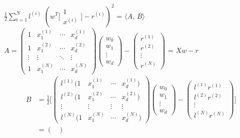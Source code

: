 \documentclass[12pt]{article}
\begin{document}
\begin {enumerate}
\begin {enumerate}
\begin {flushleft}
						$\frac{1}{2}\displaystyle\sum_{t=1}^N l^{(i)}$ 
							$(w^T \bigg[ \begin{array}{c}1 \\ x^{(i)}\end{array} \bigg] - r^{(i)})^2$ = 
							$\langle A$, $B \rangle$ \\
						$A = 
						\begin{pmatrix}
							1 & x_1^{(1)} & \cdots & x_d^{(1)} \\
							1 & x_1^{(2)} & \cdots & x_d^{(2)} \\
							\vdots & \vdots & \ddots & \vdots \\
							1 & x_1^{(N)} & \cdots & x_d^{(N)}
						\end{pmatrix}
						\begin{pmatrix}
							w_0 \\ w_1 \\ \vdots \\ w_d
						\end{pmatrix} - 
						\begin{pmatrix}
							r^{(1)} \\ r^{(2)} \\ \vdots \\ r^{(N)}
						\end{pmatrix}$ = $Xw-r$ \\
						\begin{align*}
							B & = \frac{1}{2} \Bigg[
							\begin{pmatrix}
								l^{(1)}(1 & x_1^{(1)} & \cdots & x_d^{(1)}) \\
								l^{(2)}(1 & x_1^{(2)} & \cdots & x_d^{(2)}) \\
								\vdots & \vdots & \vdots & \vdots \\
								l^{(N)}(1 & x_1^{(N)} & \cdots & x_d^{(N)})
							\end{pmatrix}
							\begin{pmatrix}
								w_0 \\ w_1 \\ \vdots \\ w_d
							\end{pmatrix} - 
							\begin{pmatrix}
								l^{(1)}r^{(1)} \\ l^{(2)}r^{(2)} \\ \vdots \\ l^{(N)}r^{(N)}
							\end{pmatrix} \Bigg] \\
							& = 
							\begin{pmatrix}

\end{pmatrix}
\end{align*}
\end{flushleft}
\end{enumerate}
\end{enumerate}
\end{document}

